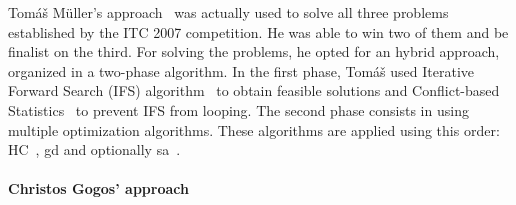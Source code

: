 Tom\'{a}\v{s} M\"{u}ller's approach~\cite{Mueller2009} was actually used to solve all three problems established by the ITC 2007 competition. He was able to win two of them and be finalist on the third. For solving the problems, he opted for an hybrid approach, organized in a two-phase algorithm. In the first phase, Tom\'{a}\v{s} used Iterative Forward Search (IFS) algorithm~\cite{Mueller2005} to obtain feasible solutions and Conflict-based Statistics~\cite{Rudova2004} to prevent IFS from looping. 
The second phase consists in using multiple optimization algorithms. These algorithms are applied using this order: HC~\cite{Russell2010}, \gls{gd} \cite{Dueck1993} and optionally \gls{sa}~\cite{Kirkpatrick1983}.\\


\paragraph{Christos Gogos' approach}

